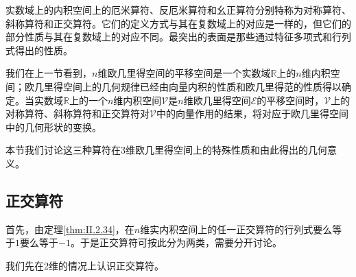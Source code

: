 \documentclass[../main.tex]{subfiles}
\begin{document}
实数域上的内积空间上的厄米算符、反厄米算符和幺正算符分别特称为对称算符、斜称算符和正交算符。它们的定义方式与其在复数域上的对应是一样的，但它们的部分性质与其在复数域上的对应不同。最突出的表面是那些通过特征多项式和行列式得出的性质。

我们在上一节看到，$n$维欧几里得空间的平移空间是一个实数域$\mathbb{R}$上的$n$维内积空间；欧几里得空间上的几何规律已经由向量内积的性质和欧几里得范的性质得以确定。当实数域$\mathbb{R}$上的一个$n$维内积空间$\mathcal{V}$是$n$维欧几里得空间$\mathcal{E}$的平移空间时，$\mathcal{V}$上的对称算符、斜称算符和正交算符对$\mathcal{V}$中的向量作用的结果，将对应于欧几里得空间中的几何形状的变换。

本节我们讨论这三种算符在3维欧几里得空间上的特殊性质和由此得出的几何意义。

\subsection{正交算符}\label{sec:II.3.3.1}
首先，由定理\ref{thm:II.2.34}，在$n$维实内积空间上的任一正交算符的行列式要么等于$1$要么等于$-1$。于是正交算符可按此分为两类，需要分开讨论。

我们先在2维的情况上认识正交算符。
\end{document}
